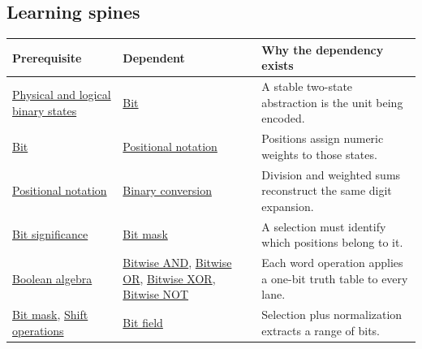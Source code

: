 \subsection{Learning spines}\label{appendix-4ad47bdd269a-learning-spines}

{\def\LTcaptype{none} %
\begin{longtable}[]{@{}
  >{\raggedright\arraybackslash}p{}
  >{\raggedright\arraybackslash}p{}
  >{\raggedright\arraybackslash}p{}@{}}
\toprule\noalign{}
\begin{minipage}[b]{\linewidth}\raggedright
Prerequisite
\end{minipage} & \begin{minipage}[b]{\linewidth}\raggedright
Dependent
\end{minipage} & \begin{minipage}[b]{\linewidth}\raggedright
Why the dependency exists
\end{minipage} \\
\midrule\noalign{}
\endhead
\bottomrule\noalign{}
\endlastfoot
\hyperref[appendix-ea798b1ceb35]{Physical and logical binary states} & \hyperref[appendix-ddbb69998a2e]{Bit} & A stable two-state abstraction is the unit being encoded. \\
\hyperref[appendix-ddbb69998a2e]{Bit} & \hyperref[appendix-83c3f28f7bda]{Positional notation} & Positions assign numeric weights to those states. \\
\hyperref[appendix-83c3f28f7bda]{Positional notation} & \hyperref[appendix-dc552784a2c0]{Binary conversion} & Division and weighted sums reconstruct the same digit expansion. \\
\hyperref[appendix-280445746493]{Bit significance} & \hyperref[appendix-dbe5905163c2]{Bit mask} & A selection must identify which positions belong to it. \\
\hyperref[appendix-24475e1596a8]{Boolean algebra} & \hyperref[appendix-68b52453737c]{Bitwise AND}, \hyperref[appendix-a427ce8ce8a6]{Bitwise OR}, \hyperref[appendix-d49161831368]{Bitwise XOR}, \hyperref[appendix-8f38927cfc54]{Bitwise NOT} & Each word operation applies a one-bit truth table to every lane. \\
\hyperref[appendix-dbe5905163c2]{Bit mask}, \hyperref[appendix-73425b25118e]{Shift operations} & \hyperref[appendix-ac697f5c66e8]{Bit field} & Selection plus normalization extracts a range of bits. \\

\end{longtable}}
